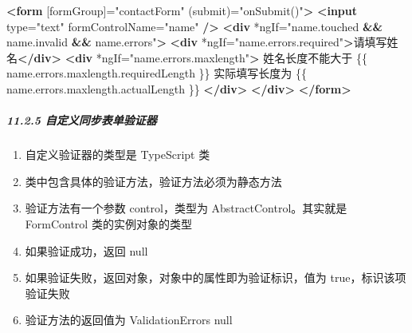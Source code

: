 \documentclass[
]{article}
\newenvironment{Shaded}{}{}
\newcommand{\ErrorTok}[1]{\textcolor[rgb]{1.00,0.00,0.00}{\textbf{#1}}}
\newcommand{\KeywordTok}[1]{\textcolor[rgb]{0.00,0.44,0.13}{\textbf{#1}}}
\newcommand{\NormalTok}[1]{#1}
\newcommand{\OtherTok}[1]{\textcolor[rgb]{0.00,0.44,0.13}{#1}}
\newcommand{\StringTok}[1]{\textcolor[rgb]{0.25,0.44,0.63}{#1}}
\begin{document}
\begin{enumerate}
\begin{Shaded}
\begin{Highlighting}[]
\KeywordTok{\textless{}form}\OtherTok{ [formGroup]=}\StringTok{"contactForm"}\OtherTok{ (submit)=}\StringTok{"onSubmit()"}\KeywordTok{\textgreater{}}
  \KeywordTok{\textless{}input}\OtherTok{ type=}\StringTok{"text"}\OtherTok{ formControlName=}\StringTok{"name"} \KeywordTok{/\textgreater{}}
  \KeywordTok{\textless{}div}\OtherTok{ *ngIf=}\StringTok{"name.touched }\ErrorTok{\&\&}\StringTok{ name.invalid }\ErrorTok{\&\&}\StringTok{ name.errors"}\KeywordTok{\textgreater{}}
    \KeywordTok{\textless{}div}\OtherTok{ *ngIf=}\StringTok{"name.errors.required"}\KeywordTok{\textgreater{}}\NormalTok{请填写姓名}\KeywordTok{\textless{}/div\textgreater{}}
    \KeywordTok{\textless{}div}\OtherTok{ *ngIf=}\StringTok{"name.errors.maxlength"}\KeywordTok{\textgreater{}}
\NormalTok{      姓名长度不能大于}
\NormalTok{      \{\{ name.errors.maxlength.requiredLength \}\} 实际填写长度为}
\NormalTok{      \{\{ name.errors.maxlength.actualLength \}\}}
    \KeywordTok{\textless{}/div\textgreater{}}
  \KeywordTok{\textless{}/div\textgreater{}}
\KeywordTok{\textless{}/form\textgreater{}}
\end{Highlighting}
\end{Shaded}
\end{enumerate}

\hypertarget{1125-ux81eaux5b9aux4e49ux540cux6b65ux8868ux5355ux9a8cux8bc1ux5668}{%
\subparagraph{11.2.5
自定义同步表单验证器}\label{1125-ux81eaux5b9aux4e49ux540cux6b65ux8868ux5355ux9a8cux8bc1ux5668}}

\begin{enumerate}
\def\labelenumi{\arabic{enumi}.}
\item
  自定义验证器的类型是 TypeScript 类
\item
  类中包含具体的验证方法，验证方法必须为静态方法
\item
  验证方法有一个参数 control，类型为 AbstractControl。其实就是
  FormControl 类的实例对象的类型
\item
  如果验证成功，返回 null
\item
  如果验证失败，返回对象，对象中的属性即为验证标识，值为
  true，标识该项验证失败
\item
  验证方法的返回值为 ValidationErrors \textbar{} null
\end{enumerate}
\end{document}
